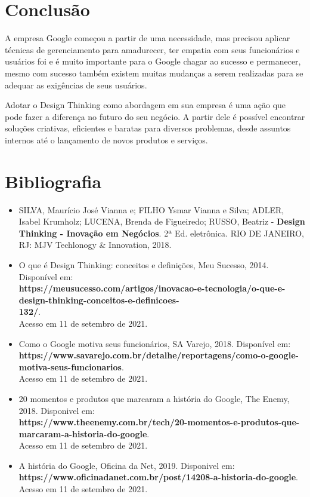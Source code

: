 \documentclass[a4paper]{article}
\begin{document}
\vfill
\pagebreak
\section{Conclusão}
\par A empresa Google começou a partir de uma necessidade, mas precisou aplicar técnicas de gerenciamento para amadurecer, ter empatia com seus funcionários e usuários foi e é muito importante para o Google chagar ao sucesso e permanecer, mesmo com sucesso também existem muitas mudanças a serem realizadas para se adequar as exigências de seus usuários.
\par Adotar o Design Thinking como abordagem em sua empresa é uma ação que pode fazer a diferença no futuro do seu negócio. A partir dele é possível encontrar soluções criativas, eficientes e baratas para diversos problemas, desde assuntos internos até o lançamento de novos produtos e serviços.


\vfill
\pagebreak
\section{Bibliografia}
\begin{itemize}
    \item SILVA, Maurício José Vianna e; FILHO Ysmar Vianna e Silva; ADLER, Isabel Krumholz; LUCENA, Brenda de Figueiredo; RUSSO, Beatriz - \textbf{Design Thinking - Inovação em Negócios}. 2ª Ed. eletrônica. RIO DE JANEIRO, RJ: MJV Techlonogy \& Innovation, 2018.
    
    \item O que é Design Thinking: conceitos e definições, Meu Sucesso, 2014. Disponível em: \textbf{\\ https://meusucesso.com/artigos/inovacao-e-tecnologia/o-que-e-design-thinking-conceitos-e-definicoes-\\132/}.
    \\Acesso em 11 de setembro de 2021.
    
    \item Como o Google motiva seus funcionários, SA Varejo, 2018. Disponível em: \textbf{\\https://www.savarejo.com.br/detalhe/reportagens/como-o-google-motiva-seus-funcionarios}.
    \\Acesso em 11 de setembro de 2021.
    
    \item 20 momentos e produtos que marcaram a história do Google, The Enemy, 2018. Disponivel em: \textbf{\\https://www.theenemy.com.br/tech/20-momentos-e-produtos-que-marcaram-a-historia-do-google}. \\Acesso em 11 de setembro de 2021.
    
    \item A história do Google, Oficina da Net, 2019. Disponivel em:  \textbf{\\https://www.oficinadanet.com.br/post/14208-a-historia-do-google}.
    \\Acesso em 11 de setembro de 2021.
\end{itemize}
\end{document}
